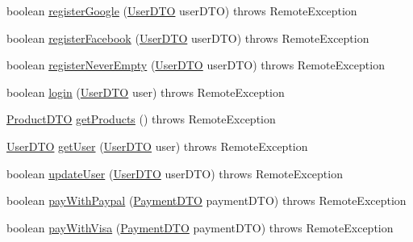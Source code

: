 \begin{DoxyCompactItemize}
\item 
boolean \mbox{\hyperlink{interface_s_p_q_1_1remote_1_1_i_never_empty_facade_a93f3250c09a26fdb1d65219599dfd542}{register\+Google}} (\mbox{\hyperlink{class_s_p_q_1_1dto_1_1_user_d_t_o}{User\+D\+TO}} user\+D\+TO)  throws Remote\+Exception
\item 
boolean \mbox{\hyperlink{interface_s_p_q_1_1remote_1_1_i_never_empty_facade_a7b2f025522489fe9070d09a4fb08f0a1}{register\+Facebook}} (\mbox{\hyperlink{class_s_p_q_1_1dto_1_1_user_d_t_o}{User\+D\+TO}} user\+D\+TO)  throws Remote\+Exception
\item 
boolean \mbox{\hyperlink{interface_s_p_q_1_1remote_1_1_i_never_empty_facade_a7867e1e698fea32a535a1daeda4e8d6a}{register\+Never\+Empty}} (\mbox{\hyperlink{class_s_p_q_1_1dto_1_1_user_d_t_o}{User\+D\+TO}} user\+D\+TO)  throws Remote\+Exception
\item 
boolean \mbox{\hyperlink{interface_s_p_q_1_1remote_1_1_i_never_empty_facade_a2440fa36695c63e4e4c30fc25965f853}{login}} (\mbox{\hyperlink{class_s_p_q_1_1dto_1_1_user_d_t_o}{User\+D\+TO}} user)  throws Remote\+Exception
\item 
\mbox{\hyperlink{class_s_p_q_1_1dto_1_1_product_d_t_o}{Product\+D\+TO}} \mbox{\hyperlink{interface_s_p_q_1_1remote_1_1_i_never_empty_facade_a62d4a1747b8ba90f451fc9f9343055f3}{get\+Products}} ()  throws Remote\+Exception
\item 
\mbox{\hyperlink{class_s_p_q_1_1dto_1_1_user_d_t_o}{User\+D\+TO}} \mbox{\hyperlink{interface_s_p_q_1_1remote_1_1_i_never_empty_facade_aa329dfc23ab0832e73802bf2df90b9e0}{get\+User}} (\mbox{\hyperlink{class_s_p_q_1_1dto_1_1_user_d_t_o}{User\+D\+TO}} user)  throws Remote\+Exception
\item 
boolean \mbox{\hyperlink{interface_s_p_q_1_1remote_1_1_i_never_empty_facade_add6dafb25f59c549e924c76c6e8f31c6}{update\+User}} (\mbox{\hyperlink{class_s_p_q_1_1dto_1_1_user_d_t_o}{User\+D\+TO}} user\+D\+TO)  throws Remote\+Exception
\item 
boolean \mbox{\hyperlink{interface_s_p_q_1_1remote_1_1_i_never_empty_facade_a2d34c64f91537d8c7138094e418de785}{pay\+With\+Paypal}} (\mbox{\hyperlink{class_s_p_q_1_1dto_1_1_payment_d_t_o}{Payment\+D\+TO}} payment\+D\+TO)  throws Remote\+Exception
\item 
boolean \mbox{\hyperlink{interface_s_p_q_1_1remote_1_1_i_never_empty_facade_a3b7058d95e7b73bdcc09220ecfc2d744}{pay\+With\+Visa}} (\mbox{\hyperlink{class_s_p_q_1_1dto_1_1_payment_d_t_o}{Payment\+D\+TO}} payment\+D\+TO)  throws Remote\+Exception
\end{DoxyCompactItemize}


